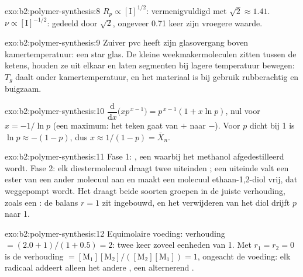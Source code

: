 \begin{solution}{exo:b2:polymer-synthesis:8}
$R_p \propto [\mathrm I]^{1/2}$: vermenigvuldigd met $\sqrt2 \approx 1.41$. $\nu \propto [\mathrm I]^{-1/2}$:
gedeeld door $\sqrt 2$, ongeveer 0.71 keer zijn vroegere waarde.
\end{solution}

\begin{solution}{exo:b2:polymer-synthesis:9}
Zuiver pvc heeft zijn glasovergang boven kamertemperatuur: een star glas. De kleine
weekmakermoleculen zitten tussen de ketens, houden ze uit elkaar en laten segmenten bij lagere temperatuur bewegen: $T_g$ daalt
onder kamertemperatuur, en het materiaal is bij gebruik rubberachtig en buigzaam.
\end{solution}

\begin{solution}{exo:b2:polymer-synthesis:10}
$\dfrac{\mathrm d}{\mathrm dx}\bigl(x p^{\,x-1}\bigr) = p^{\,x-1}(1 + x\ln p)$, nul voor $x = -1/\ln p$
(een maximum: het teken gaat van $+$ naar $-$). Voor $p$ dicht bij 1 is $\ln p \approx -(1-p)$, dus $x \approx
1/(1-p) = \bar X_n$.
\end{solution}

\begin{solution}{exo:b2:polymer-synthesis:11}
Fase 1: , een 
waarbij het methanol afgedestilleerd wordt. Fase 2: elk diestermolecuul draagt twee uiteinden ; een uiteinde valt een ester
van een ander molecuul aan en maakt een molecuul ethaan-1,2-diol vrij, dat weggepompt wordt. Het 
draagt beide soorten groepen in de juiste verhouding, zoals een  : de balans $r = 1$ zit
ingebouwd, en het verwijderen van het diol drijft $p$ naar 1.
\end{solution}

\begin{solution}{exo:b2:polymer-synthesis:12}
Equimolaire voeding: verhouding $= (2.0 + 1)/(1 + 0.5) = 2$: twee keer zoveel eenheden van  1. Met $r_1 = r_2 =
0$ is de verhouding $= [\mathrm M_1][\mathrm M_2]/([\mathrm M_2][\mathrm M_1]) = 1$, ongeacht de voeding: elk
radicaal addeert alleen het andere , een alternerend .
\end{solution}

